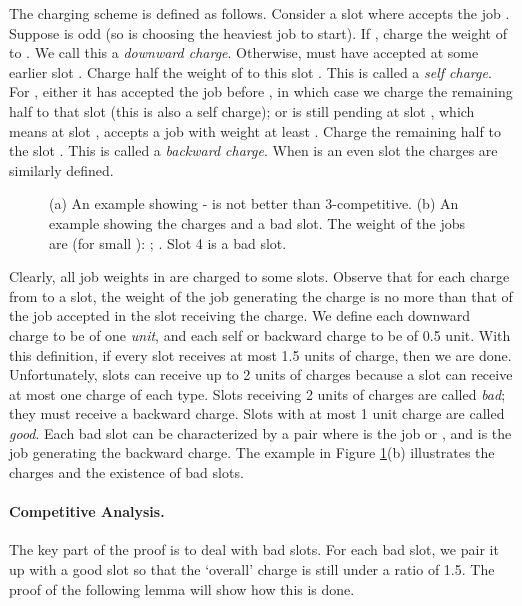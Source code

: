 \documentclass[11pt]{article}
\begin{document}
The charging scheme is defined as follows.
Consider a slot  where  accepts the job .
Suppose  is odd (so  is choosing the heaviest job to start).
If , charge the weight of  to .
We call this a {\it downward charge}.
Otherwise,  must have 
accepted  at some earlier slot .
Charge half the weight of  to this slot .
This is called a {\it self charge}.
For , either it has accepted the job  before , 
in which case we charge the remaining half to that slot
(this is also a self charge);
or  is still pending at slot , which means at slot , 
 accepts a job with weight at least .
Charge the remaining half to the slot .
This is called a {\it backward charge}.
When  is an even slot the charges are similarly defined.

\begin{figure}
\centerline{ \epsfysize=2in  }
\caption{(a) An example showing - is not better than 3-competitive.
(b) An example showing the charges and a bad slot.
The weight of the jobs are (for small ):
;
. Slot 4 is a bad slot.}
\label{fig:ran-j}
\end{figure}

Clearly, all job weights in  are charged to some slots.
Observe that for each charge from  to a slot,
the weight of the job generating the charge is no more than
that of the job accepted in the slot receiving the charge.
We define each downward charge to be of one {\it unit}, and each self
or backward charge to be of 0.5 unit.
With this definition, if every slot receives at most 1.5 units of charge, 
then we are done.
Unfortunately, slots can receive up to 2 units of charges
because a slot can receive at most one charge of each type.
Slots receiving 2 units of charges are called {\it bad}; they must receive
a backward charge.
Slots with at most 1 unit charge are called {\it good}.  
Each bad slot  can be characterized by a pair  where  is the 
job  or , and  is the job  generating the backward
charge.
The example in Figure \ref{fig:ran-j}(b) illustrates the charges 
and the existence of bad slots.

\paragraph{Competitive Analysis.}

The key part of the proof is to deal with bad slots.
For each bad slot, we pair it up with a good slot 
so that the `overall' charge is still under a ratio of 1.5.
The proof of the following lemma will show how this is done. 
\end{document}
